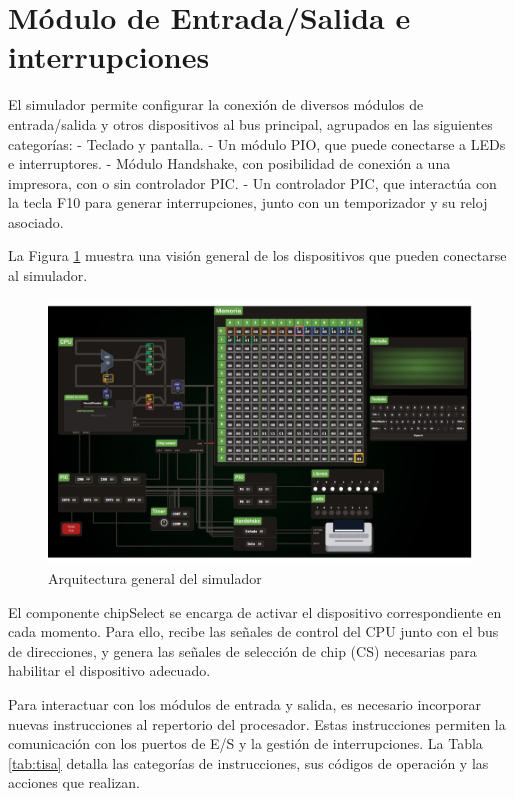 \documentclass[12pt,oneside]{templates/unerthesis}
\begin{document}
\hypertarget{muxf3dulo-de-entradasalida-e-interrupciones}{%
\section{Módulo de Entrada/Salida e interrupciones}\label{muxf3dulo-de-entradasalida-e-interrupciones}}

El simulador permite configurar la conexión de diversos módulos de entrada/salida y otros dispositivos al bus principal, agrupados en las siguientes categorías:
- Teclado y pantalla.
- Un módulo PIO, que puede conectarse a LEDs e interruptores.
- Módulo Handshake, con posibilidad de conexión a una impresora, con o sin controlador PIC.
- Un controlador PIC, que interactúa con la tecla F10 para generar interrupciones, junto con un temporizador y su reloj asociado.

La Figura \ref{fig:dispositivos} muestra una visión general de los dispositivos que pueden conectarse al simulador.

\begin{figure}

{\centering \includegraphics[width=0.85\linewidth]{images/esquemavonsim8} 

}

\caption{Arquitectura general del simulador}\label{fig:dispositivos}
\end{figure}

El componente chipSelect se encarga de activar el dispositivo correspondiente en cada momento. Para ello, recibe las señales de control del CPU junto con el bus de direcciones, y genera las señales de selección de chip (CS) necesarias para habilitar el dispositivo adecuado.

Para interactuar con los módulos de entrada y salida, es necesario incorporar nuevas instrucciones al repertorio del procesador. Estas instrucciones permiten la comunicación con los puertos de E/S y la gestión de interrupciones. La Tabla \ref{tab:tisa} detalla las categorías de instrucciones, sus códigos de operación y las acciones que realizan.
\end{document}
